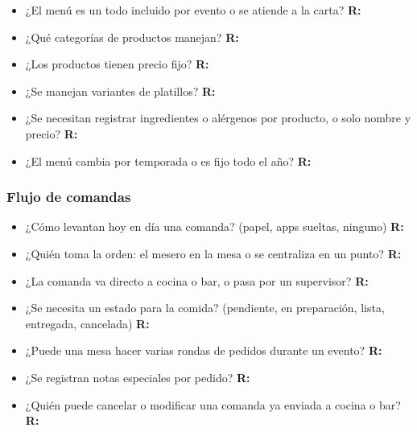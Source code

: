\begin{itemize}
    \item ¿El menú es un todo incluido por evento o se atiende a la carta?
    \subitem \textbf{R:}

    \item ¿Qué categorías de productos manejan?
    \subitem \textbf{R:}

    \item ¿Los productos tienen precio fijo?
    \subitem \textbf{R:}

    \item ¿Se manejan variantes de platillos?
    \subitem \textbf{R:}

    \item ¿Se necesitan registrar ingredientes o alérgenos por producto, o solo nombre y precio?
    \subitem \textbf{R:}

    \item ¿El menú cambia por temporada o es fijo todo el año?
    \subitem \textbf{R:}
\end{itemize}

\subsubsection{Flujo de comandas}

\begin{itemize}
    \item ¿Cómo levantan hoy en día una comanda? (papel, apps sueltas, ninguno)
    \subitem \textbf{R:}

    \item ¿Quién toma la orden: el mesero en la mesa o se centraliza en un punto?
    \subitem \textbf{R:}

    \item ¿La comanda va directo a cocina o bar, o pasa por un supervisor?
    \subitem \textbf{R:}

    \item ¿Se necesita un estado para la comida? (pendiente, en preparación, lista, entregada, cancelada)
    \subitem \textbf{R:}

    \item ¿Puede una mesa hacer varias rondas de pedidos durante un evento?
    \subitem \textbf{R:}

    \item ¿Se registran notas especiales por pedido?
    \subitem \textbf{R:}

    \item ¿Quién puede cancelar o modificar una comanda ya enviada a cocina o bar?
    \subitem \textbf{R:}
\end{itemize}

